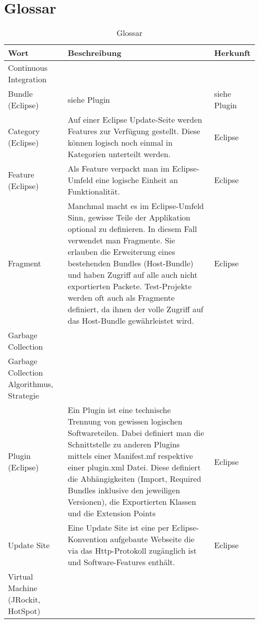 \chapter*{Glossar}\label{glossar}
  \begin{longtable}{|p{5cm}|p{6cm}|p{3cm}|}
      \caption{Glossar}\\
\hline
  \textbf{Wort} & \textbf{Beschreibung} & \textbf{Herkunft}\\\hline
  Continuous Integration  &&\\\hline
  Bundle (Eclipse) & siehe Plugin & siehe Plugin\\\hline
  Category (Eclipse) & Auf einer Eclipse Update-Seite werden Features zur Verfügung gestellt. Diese können logisch noch einmal in Kategorien unterteilt werden. & Eclipse\\\hline
  Feature (Eclipse) & Als Feature verpackt man im Eclipse-Umfeld eine logische Einheit an Funktionalität. & Eclipse\\\hline
  Fragment & Manchmal macht es im Eclipse-Umfeld Sinn, gewisse Teile der Applikation optional zu definieren. In diesem Fall verwendet man Fragmente. Sie erlauben die Erweiterung eines bestehenden Bundles (Host-Bundle) und haben Zugriff auf alle auch nicht exportierten Packete. Test-Projekte werden oft auch als Fragmente definiert, da ihnen der volle Zugriff auf das Host-Bundle gewährleistet wird. & Eclipse\\\hline
  Garbage Collection & & \\\hline
  Garbage Collection Algorithmus, Strategie & & \\\hline
  Plugin (Eclipse) & Ein Plugin ist eine technische Trennung von gewissen logischen Softwareteilen. Dabei definiert man die Schnittstelle zu anderen Plugins mittels einer Manifest.mf respektive einer plugin.xml Datei. Diese definiert die Abhängigkeiten (Import, Required Bundles inklusive den jeweiligen Versionen), die Exportierten Klassen und die Extension Points  & Eclipse\\\hline
  Update Site & Eine Update Site ist eine per Eclipse-Konvention aufgebaute Webseite die via das Http-Protokoll zugänglich ist und Software-Features enthält.& Eclipse\\\hline
  Virtual Machine (JRockit, HotSpot) & & \\\hline
  \end{longtable}



